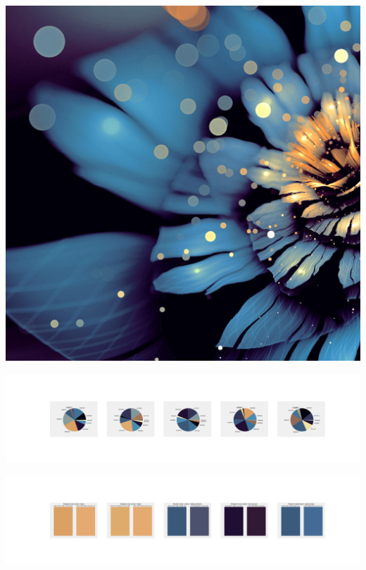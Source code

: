 \documentclass[11pt]{article}
\begin{document}
\begin{landscape}
    \begin{center}
    \includegraphics[width=\textwidth]{./nbimg/file (426).jpg}
    \end{center}

    \begin{center}
    \includegraphics[width=250mm]{./nbimg/pie-363.jpg}
    \end{center}

    \begin{center}
    \includegraphics[width=250mm]{./nbimg/peak-363.jpg}
    \end{center}
    


\end{landscape}
\end{document}
